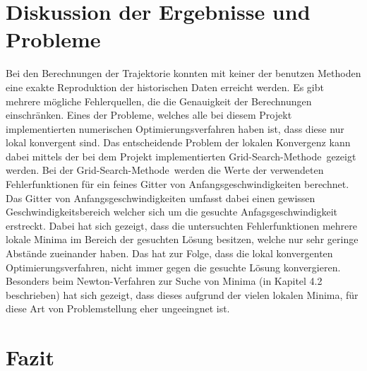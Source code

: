 \section{Diskussion der Ergebnisse und Probleme}

Bei den Berechnungen der Trajektorie konnten mit keiner der benutzen Methoden eine exakte Reproduktion der historischen Daten erreicht werden. Es gibt mehrere mögliche Fehlerquellen, die die Genauigkeit der Berechnungen einschränken. Eines der Probleme, welches alle bei diesem Projekt implementierten numerischen Optimierungsverfahren haben ist, dass diese nur lokal konvergent sind. Das entscheidende  Problem der lokalen Konvergenz kann dabei mittels der bei dem Projekt implementierten \glqq Grid-Search-Methode\grqq\, gezeigt werden. Bei der \glqq Grid-Search-Methode\grqq\, werden die Werte der verwendeten Fehlerfunktionen für ein feines Gitter von Anfangsgeschwindigkeiten berechnet. Das Gitter von Anfangsgeschwindigkeiten umfasst dabei einen gewissen Geschwindigkeitsbereich welcher sich um die gesuchte Anfagsgeschwindigkeit erstreckt. Dabei hat sich gezeigt, dass die untersuchten Fehlerfunktionen mehrere lokale Minima im Bereich der gesuchten Lösung besitzen, welche nur sehr geringe Abstände zueinander haben. Das hat zur Folge, dass die lokal konvergenten Optimierungsverfahren, nicht immer gegen die gesuchte Lösung konvergieren. Besonders beim Newton-Verfahren zur Suche von Minima (in Kapitel 4.2 beschrieben) hat sich gezeigt, dass dieses aufgrund der vielen lokalen Minima, für diese Art von Problemstellung eher ungeeingnet ist.

\section{Fazit}




